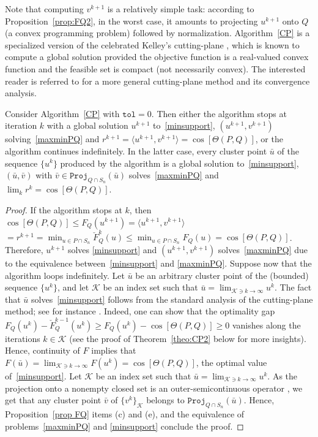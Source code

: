 \documentclass[hidelinks,onefignum,onetabnum]{siamart250211}
\theoremstyle{definition}
\theoremstyle{remark}
\newcommand{\inner}[2]{\langle#1,#2\rangle}
\newcommand{\proj}{\mathtt{Proj}}
\begin{document}
Note that computing $v^{k+1}$ is a relatively simple task: according to Proposition~\ref{prop:FQ2}, in the worst case, it amounts to projecting $u^{k+1}$ onto $Q$ (a convex programming problem) followed by normalization.
Algorithm~\ref{CP} is a specialized version of the celebrated Kelley's cutting-plane \cite{Kelley_1960}, which is known to compute a global solution provided the objective function is a real-valued convex function and the feasible set is compact (not necessarily convex).
The interested reader is referred to \cite[Ch.~10]{WWBook} for a more general cutting-plane method and its convergence analysis.
\begin{theorem}\label{theo:CP}
    Consider Algorithm~\ref{CP} with $\mathtt{tol} =0$. Then either the algorithm stops at iteration $k$ with a global solution $u^{k+1}$ to~\eqref{minsupport},  $(u^{k+1},v^{k+1})$  solving~\eqref{maxminPQ} and $r^{k+1}=\inner{u^{k+1}}{v^{k+1}}=\cos[\Theta(P,Q)]$, or the algorithm continues indefinitely. In the latter case, every cluster point $\bar u$ of the sequence $\{ u^{k}\}$ produced by the algorithm is a global solution to~\eqref{minsupport},  $(\bar u, \bar v)$ with $\bar v \in \proj_{Q\cap S_n}(\bar u)$ solves~\eqref{maxminPQ} and $\lim_{k} r^k =\cos[\Theta(P,Q)]$.
\end{theorem}
\begin{proof}
If the algorithm stops at $k$, then $\cos[\Theta(P,Q)]\leq F_Q(u^{k+1})= \inner{u^{k+1}}{v^{k+1}} $ $= r^{k+1}= \min_{u \in P\cap S_n} \check F^k_Q(u) \leq \min_{u \in P\cap S_n} F_Q(u)=\cos[\Theta(P,Q)] $. Therefore, $u^{k+1}$ solves \eqref{minsupport} and  $(u^{k+1},v^{k+1})$  solves~\eqref{maxminPQ} due to the equivalence between~\eqref{minsupport} and \eqref{maxminPQ}. Suppose now that the algorithm loops indefinitely. Let $\bar u$ be an arbitrary cluster point of the (bounded) sequence $\{u^k\}$, and let $\mathcal{K}$  be an index set such that $ \bar u= \lim_{\mathcal{K}\ni k \to \infty} u^k$.
    The fact that $\bar u$ solves~\eqref{minsupport} follows from the standard analysis of the cutting-plane method; see for instance \cite[Th.~10.1]{WWBook}.
     Indeed, one can show that the optimality gap $F_Q(u^{k})-\check F^{k-1}_Q(u^{k})\geq F_Q(u^{k}) - \cos[\Theta(P,Q)]\geq 0$ vanishes along the iterations $k \in \mathcal{K}$ (see the proof of Theorem~\ref{theo:CP2} below for more insights). Hence, continuity of $F$ implies that $F(\bar u)=\lim_{\mathcal{K} \ni k\to \infty} F(u^{k})= \cos[\Theta(P,Q)]$, the optimal value of~\eqref{minsupport}.
     Let $\mathcal{K}$  be an index set such that $ \bar u= \lim_{\mathcal{K}\ni k \to \infty} u^k$. As the projection onto a nonempty closed set is an outer-semicontinuous operator \cite[Example 5.23]{Rock-Wets}, we get that  any cluster point $\bar v$ of $\{v^k\}_{\mathcal{K}}$ belongs to $ \proj_{Q\cap S_n}(\bar u)$. Hence, Proposition~\ref{prop FQ} items (c) and (e), and the equivalence of problems~\eqref{maxminPQ} and \eqref{minsupport}  conclude the proof.
\end{proof}
\end{document}
